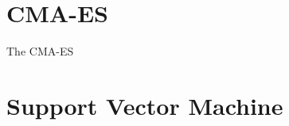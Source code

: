 
\section{CMA-ES}
\label{sec:cma-es}

The \acf{CMA-ES}






\section{Support Vector Machine}
\label{sec:svm}



